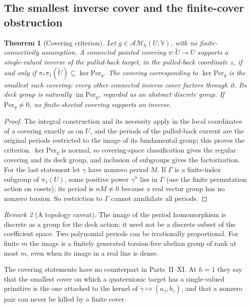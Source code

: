 \documentclass[11pt,a4paper]{article}
\numberwithin{equation}{section}
\newtheorem{theorem}{Theorem}[section]
\theoremstyle{definition}
\theoremstyle{remark}
\newtheorem{remark}[theorem]{Remark}
\theoremstyle{plain}
\newcommand{\AM}{\mathcal{AM}}
\newcommand{\Per}{\mathrm{Per}}
\newcommand{\VV}{\mathbb V}                       %
\begin{document}
\subsection{The smallest inverse cover and the finite-cover obstruction}
\label{g:sub:covers}

\begin{theorem}[Covering criterion]
\label{g:thm:covers}
Let $g\in\AM_h(U;\VV)$, with no finite-connectivity assumption. A connected
pointed covering $\pi:\widetilde U\to U$ supports a single-valued inverse of the
pulled-back target, in the pulled-back coordinate $z$, if and only if
$\pi_*\pi_1(\widetilde U)\subseteq\ker\Per_g$. The covering corresponding to
$\ker\Per_g$ is the smallest such covering: every other connected inverse
cover factors through it. Its deck group is naturally $\operatorname{im}\Per_g$,
regarded as an abstract discrete group. If $\Per_g\ne0$, no finite-sheeted
covering supports an inverse.
\end{theorem}

\begin{proof}
The integral construction and its necessity apply in the local coordinates of
a covering exactly as on $U$, and the periods of the pulled-back current are
the original periods restricted to the image of its fundamental group; this
proves the criterion. $\ker\Per_g$ is normal, so covering-space classification
gives the regular covering and its deck group, and inclusion of subgroups
gives the factorization. For the last statement let $\gamma$ have nonzero
period $M$. If $\Gamma$ is a finite-index subgroup of $\pi_1(U)$, some
positive power $\gamma^n$ lies in $\Gamma$ (use the finite permutation action on
cosets); its period is $nM\ne0$ because a real vector group has no nonzero
torsion. So restriction to $\Gamma$ cannot annihilate all periods.
\end{proof}

\begin{remark}[A topology caveat]
\label{g:rem:topology}
The image of the period homomorphism is discrete as a group for the deck
action; it need not be a discrete subset of the coefficient space. Two
polynomial periods can be irrationally proportional. For finite $m$ the image
is a finitely generated torsion-free abelian group of rank at most $m$, even
when its image in a real line is dense.
\end{remark}

The covering statements have no counterpart in Parts~II--XI. At $h=1$
they say that the smallest cover on which a quaternionic target has a
single-valued primitive is the one attached to the kernel of
$\gamma\mapsto(a_\gamma,b_\gamma)$, and that a nonzero pair can never be
killed by a finite cover.
\end{document}
